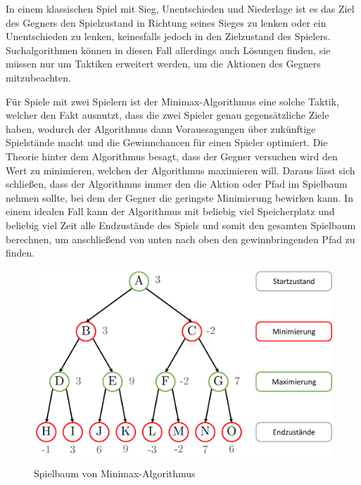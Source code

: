 In einem klassischen Spiel mit Sieg, Unentschieden und Niederlage ist es das Ziel des Gegners den Spielzustand in Richtung seines Sieges zu lenken oder ein Unentschieden zu lenken, keinesfalls jedoch in den Zielzustand des Spielers. Suchalgorithmen können in diesen Fall allerdings auch Lösungen finden, sie müssen nur um Taktiken erweitert werden, um die Aktionen des Gegners mitzubeachten. \cite{AlgorithmsMinimax}

Für Spiele mit zwei Spielern ist der Minimax-Algorithmus eine solche Taktik, welcher den Fakt ausnutzt, dass die zwei Spieler genau gegensätzliche Ziele haben, wodurch der Algorithmus dann Voraussagungen über zukünftige Spielstände macht und die Gewinnchancen für einen Spieler optimiert. Die Theorie hinter dem Algorithmus besagt, dass der Gegner versuchen wird den Wert zu minimieren, welchen der Algorithmus maximieren will. Daraus lässt sich schließen, dass der Algorithmus immer den die Aktion oder Pfad im Spielbaum nehmen sollte, bei dem der Gegner die geringste Minimierung bewirken kann. In einem idealen Fall kann der Algorithmus mit beliebig viel Speicherplatz und beliebig viel Zeit alle Endzustände des Spiels und somit den gesamten Spielbaum berechnen, um anschließend von unten nach oben den gewinnbringenden Pfad zu finden. \cite{AlgorithmsMinimax}

\begin{figure}[!ht]
    \centering
    \includegraphics[width=\textwidth]{res/pictures/minimax-tree.pdf}
    \caption{Spielbaum von Minimax-Algorithmus}
    \label{fig:minimax-tree}
\end{figure}

